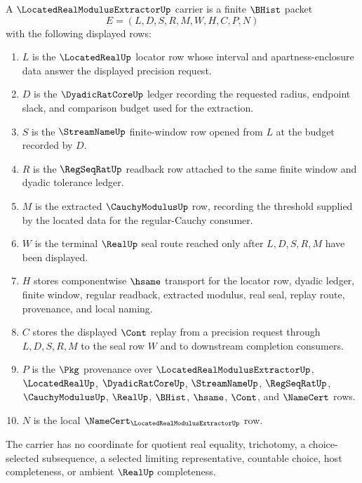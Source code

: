 \begin{definition}
\label{def:located-real-modulus-extractor-carrier}
A $\LocatedRealModulusExtractorUp$ carrier is a finite $\BHist$ packet
$$
E=(L,D,S,R,M,W,H,C,P,N)
$$
with the following displayed rows:
\begin{enumerate}
\item $L$ is the $\LocatedRealUp$ locator row whose interval and apartness-enclosure data answer the displayed precision request.
\item $D$ is the $\DyadicRatCoreUp$ ledger recording the requested radius, endpoint slack, and comparison budget used for the extraction.
\item $S$ is the $\StreamNameUp$ finite-window row opened from $L$ at the budget recorded by $D$.
\item $R$ is the $\RegSeqRatUp$ readback row attached to the same finite window and dyadic tolerance ledger.
\item $M$ is the extracted $\CauchyModulusUp$ row, recording the threshold supplied by the located data for the regular-Cauchy consumer.
\item $W$ is the terminal $\RealUp$ seal route reached only after $L,D,S,R,M$ have been displayed.
\item $H$ stores componentwise $\hsame$ transport for the locator row, dyadic ledger, finite window, regular readback, extracted modulus, real seal, replay route, provenance, and local naming.
\item $C$ stores the displayed $\Cont$ replay from a precision request through $L,D,S,R,M$ to the seal row $W$ and to downstream completion consumers.
\item $P$ is the $\Pkg$ provenance over $\LocatedRealModulusExtractorUp$, $\LocatedRealUp$, $\DyadicRatCoreUp$, $\StreamNameUp$, $\RegSeqRatUp$, $\CauchyModulusUp$, $\RealUp$, $\BHist$, $\hsame$, $\Cont$, and $\NameCert$ rows.
\item $N$ is the local $\NameCert_{\LocatedRealModulusExtractorUp}$ row.
\end{enumerate}
The carrier has no coordinate for quotient real equality, trichotomy, a choice-selected subsequence, a selected limiting representative, countable choice, host completeness, or ambient $\RealUp$ completeness.
\end{definition}

